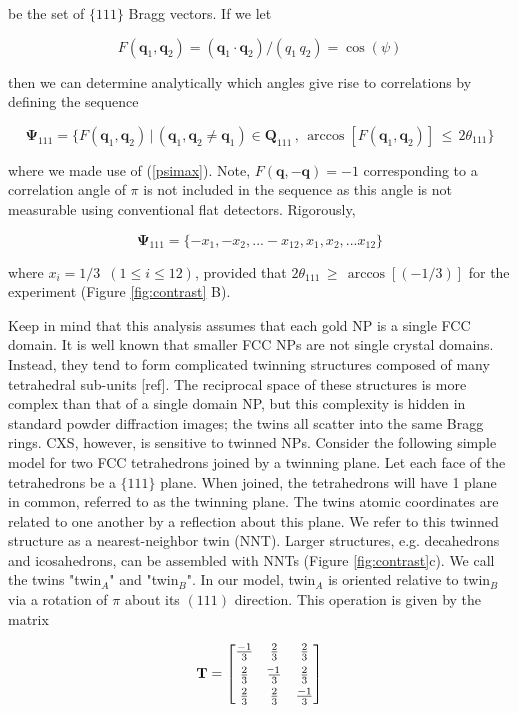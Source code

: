\documentclass [11pt,fleqn]{article}
\newcommand*{\matminus}{%
  \leavevmode
  \hphantom{0}%
  \llap{%
    \settowidth{\dimen0 }{$0$}%
    \resizebox{1.1\dimen0 }{\height}{$-$}%
  }%
}
\def \be {\begin{equation}}
\def \ee {\end{equation}}
\begin{document}
be the set of $\{111\}$ Bragg vectors. If we let 

\be
F( \bm q_1, \bm q_2) =  (\bm q_1 \cdot \bm q_2)/(q_1 \, q_2 ) = \cos( \psi )
\ee

then we can determine analytically which angles give rise to correlations by defining the sequence

\be \label{psiset}
\bm \Psi_{111} = \{ F( \bm q_1, \bm q_2)\, \big | \, (\bm q_1, \bm q_2 \ne \bm q_1) \in \bm Q_{111}\, ,\,  \arccos [F( \bm q_1, \bm q_2)]  \, \le \,  2\theta_{111}   \}
\ee 

where we made use of (\ref{psimax}). Note, $F(\bm q, -\bm q) = -1$ corresponding to a correlation angle of $\pi$ is not included in the sequence as this angle is not measurable using conventional flat detectors. Rigorously,

\be
\bm \Psi_{111} = \{ -x_1, -x_2, ... -x_{12}, x_1, x_2, ... x_{12} \}
\ee 

where $x_i = 1/3\,\,\, (1 \le i \le 12 )$, provided that $ 2\theta_{111} \, \ge \, \arccos \left[(-1/3)\right ]$ for the experiment (Figure \ref{fig:contrast} B). 

Keep in mind that this analysis assumes that each gold NP is a single FCC domain. It is well known that smaller FCC NPs are not single crystal domains. Instead, they tend to form complicated twinning structures composed of many tetrahedral sub-units [ref]. The reciprocal space of these structures is more complex than that of a single domain NP, but this complexity is hidden in standard powder diffraction images; the twins all scatter into the same Bragg rings. CXS, however, is sensitive to twinned NPs. Consider the following simple model for two FCC tetrahedrons joined by a twinning plane. Let each face of the tetrahedrons be a $\{111\}$ plane. When joined, the tetrahedrons will have 1 plane in common, referred to as the twinning plane. The twins atomic coordinates are related to one another by a reflection about this plane. We refer to this twinned structure as a nearest-neighbor twin (NNT). Larger structures, e.g. decahedrons and icosahedrons, can be assembled with NNTs (Figure \ref{fig:contrast}c). We call the twins "twin$_A$" and "twin$_B$".  In our model, twin$_A$ is oriented relative to twin$_B$ via a rotation of $\pi$ about its $(111)$ direction. This operation is given by the matrix

\be \label{twinmat}
\mathbf T = \begin{bmatrix}
       \frac{-1}{3} & \frac{2}{3} & \frac{2}{3}           \\[0.3em]
       \frac{2}{3} & \frac{\matminus 1}{3}           & \frac{2}{3} \\[0.3em]
       \frac{2}{3}           & \frac{2}{3} & \frac{-1}{3}
     \end{bmatrix}
\ee
\end{document}
